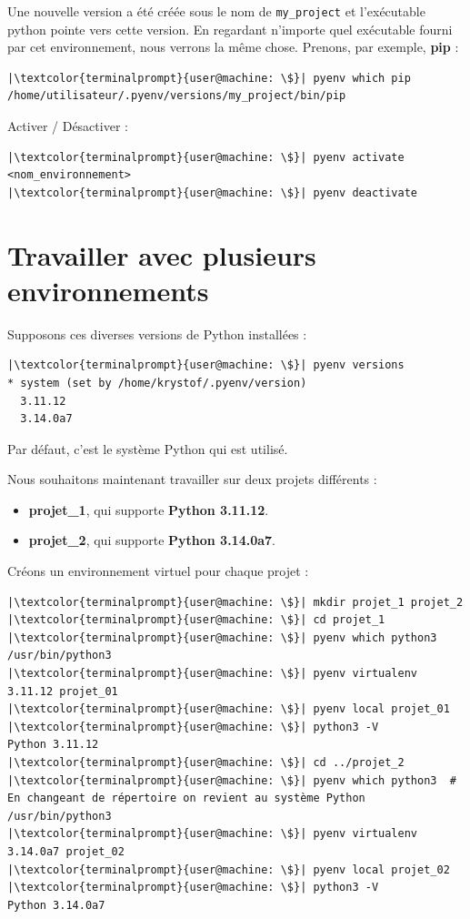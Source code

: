 Une nouvelle version a été créée sous le nom de \texttt{my\_project} et l'exécutable python pointe vers cette version. En regardant n'importe quel exécutable fourni par cet environnement, nous verrons la même chose. Prenons, par exemple, \textbf{pip} :
\begin{lstlisting}[style=terminal]
|\textcolor{terminalprompt}{user@machine: \$}| pyenv which pip
/home/utilisateur/.pyenv/versions/my_project/bin/pip
\end{lstlisting}

Activer / Désactiver :
\begin{lstlisting}[style=terminal]
|\textcolor{terminalprompt}{user@machine: \$}| pyenv activate <nom_environnement>
|\textcolor{terminalprompt}{user@machine: \$}| pyenv deactivate
\end{lstlisting}

\section{Travailler avec plusieurs environnements}
Supposons ces diverses versions de Python installées :
\begin{lstlisting}[style=terminal]
|\textcolor{terminalprompt}{user@machine: \$}| pyenv versions
* system (set by /home/krystof/.pyenv/version)
  3.11.12
  3.14.0a7
\end{lstlisting}

Par défaut, c'est le système Python qui est utilisé.

Nous souhaitons maintenant travailler sur deux projets différents :
\begin{itemize}
    \item \textbf{projet\_1}, qui supporte \textbf{Python 3.11.12}.
    \item \textbf{projet\_2}, qui supporte \textbf{Python 3.14.0a7}.
\end{itemize}

Créons un environnement virtuel pour chaque projet :
\begin{lstlisting}[style=terminal]
|\textcolor{terminalprompt}{user@machine: \$}| mkdir projet_1 projet_2
|\textcolor{terminalprompt}{user@machine: \$}| cd projet_1
|\textcolor{terminalprompt}{user@machine: \$}| pyenv which python3
/usr/bin/python3
|\textcolor{terminalprompt}{user@machine: \$}| pyenv virtualenv 3.11.12 projet_01
|\textcolor{terminalprompt}{user@machine: \$}| pyenv local projet_01
|\textcolor{terminalprompt}{user@machine: \$}| python3 -V
Python 3.11.12
|\textcolor{terminalprompt}{user@machine: \$}| cd ../projet_2
|\textcolor{terminalprompt}{user@machine: \$}| pyenv which python3  # En changeant de répertoire on revient au système Python
/usr/bin/python3
|\textcolor{terminalprompt}{user@machine: \$}| pyenv virtualenv 3.14.0a7 projet_02
|\textcolor{terminalprompt}{user@machine: \$}| pyenv local projet_02
|\textcolor{terminalprompt}{user@machine: \$}| python3 -V
Python 3.14.0a7
\end{lstlisting}

